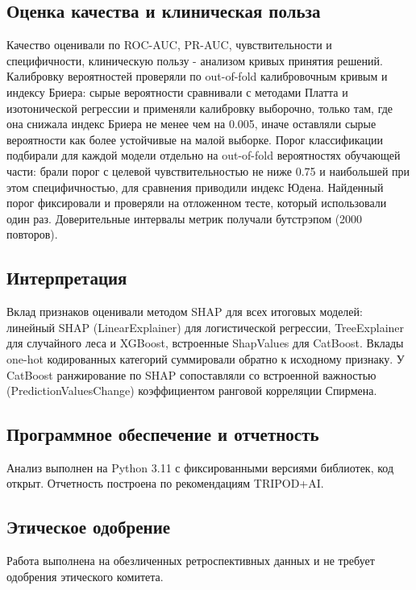 \documentclass[12pt,a4paper]{article}
\begin{document}
\subsection{Оценка качества и клиническая польза}

Качество оценивали по ROC-AUC, PR-AUC, чувствительности и специфичности, клиническую
пользу - анализом кривых принятия решений. Калибровку вероятностей проверяли по out-of-fold
калибровочным кривым и индексу Бриера: сырые вероятности сравнивали с методами Платта и
изотонической регрессии и применяли калибровку выборочно, только там, где она снижала
индекс Бриера не менее чем на 0.005, иначе оставляли сырые вероятности как более устойчивые
на малой выборке. Порог классификации подбирали для каждой модели отдельно на out-of-fold
вероятностях обучающей части: брали порог с целевой чувствительностью не ниже 0.75 и
наибольшей при этом специфичностью, для сравнения приводили индекс Юдена. Найденный порог
фиксировали и проверяли на отложенном тесте, который использовали один раз. Доверительные
интервалы метрик получали бутстрэпом (2000 повторов).

\subsection{Интерпретация}

Вклад признаков оценивали методом SHAP для всех итоговых моделей: линейный SHAP
(LinearExplainer) для логистической регрессии, TreeExplainer для случайного леса и XGBoost,
встроенные ShapValues для CatBoost. Вклады one-hot кодированных категорий суммировали
обратно к исходному признаку. У CatBoost ранжирование по SHAP сопоставляли со встроенной
важностью (PredictionValuesChange) коэффициентом ранговой корреляции Спирмена.

\subsection{Программное обеспечение и отчетность}

Анализ выполнен на Python 3.11 с фиксированными версиями библиотек, код открыт. Отчетность
построена по рекомендациям TRIPOD+AI.

\subsection{Этическое одобрение}

Работа выполнена на обезличенных ретроспективных данных и не требует одобрения этического
комитета.
\end{document}
